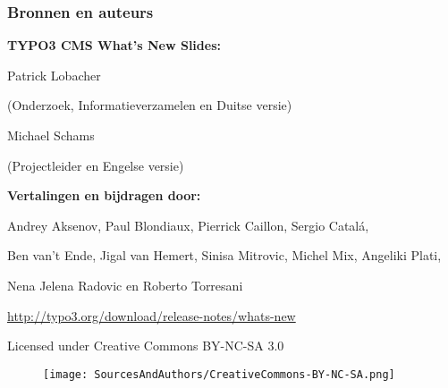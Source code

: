 \begin{frame}[fragile]
	\frametitle{Bronnen en auteurs}

	\vspace{-0.6cm}

	\centerline{\textbf{TYPO3 CMS What's New Slides:}}

	\begin{center}
		\smaller
			\centerline{Patrick Lobacher}
			\centerline{(Onderzoek, Informatieverzamelen en Duitse versie)}
			\vspace{0.1cm}
			\centerline{Michael Schams}
			\centerline{(Projectleider en Engelse versie)}
		\normalsize
	\end{center}
	\vspace{-0.6cm}
	\begin{center}
		\smaller
			\centerline{\textbf{Vertalingen en bijdragen door:}}
			\centerline{Andrey Aksenov, Paul Blondiaux, Pierrick Caillon, Sergio Catalá,}
			\centerline{Ben van't Ende, Jigal van Hemert, Sinisa Mitrovic, Michel Mix, Angeliki Plati,}
			\centerline{Nena Jelena Radovic en Roberto Torresani}
		\normalsize
	\end{center}
	\vspace{-0.6cm}
	\smaller\begin{center}\url{http://typo3.org/download/release-notes/whats-new}\end{center}\normalsize

	\smaller\begin{center}Licensed under Creative Commons BY-NC-SA 3.0\end{center}\normalsize
	\begin{figure}\vspace*{-0.3cm}
		\texttt{[image: SourcesAndAuthors/CreativeCommons-BY-NC-SA.png]}
	\end{figure}

\end{frame}

